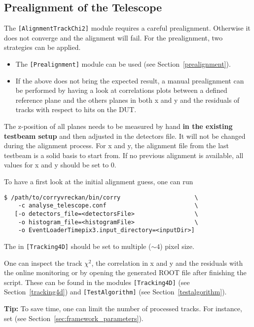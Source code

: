 \subsection*{Prealignment of the Telescope}
The \texttt{[AlignmentTrackChi2]} module requires a careful prealignment. Otherwise it does not converge and the alignment will fail.
For the prealignment, two strategies can be applied.
\begin{itemize}
\item The \texttt{[Prealignment]} module can be used (see Section~\ref{prealignment}).
\item If the above does not bring the expected result, a manual prealignment can be performed by having a look at correlations plots between a defined reference plane and the others planes in both x and y and the residuals of tracks with respect to hits on the DUT.
\end{itemize}

The z-position of all planes needs to be measured by hand \textbf{in the existing testbeam setup} and then adjusted in the detectors file. 
It will not be changed during the alignment process.
For x and y, the alignment file from the last testbeam is a solid basis to start from.
If no previous alignment is available, all values for x and y should be set to 0.

To have a first look at the initial alignment guess, one can run
\begin{verbatim}
$ /path/to/corryvreckan/bin/corry                     \
    -c analyse_telescope.conf                         \
   [-o detectors_file=<detectorsFile>                 \
    -o histogram_file=<histogramFile>                 \
    -o EventLoaderTimepix3.input_directory=<inputDir>]
\end{verbatim}

The \parameter{spatial_cut} in \texttt{[Tracking4D]} should be set to multiple ($\sim4$) pixel size.

One can inspect the track $\chi^2$, the correlation in x and y and the residuals with the online monitoring or by opening the generated ROOT file after finishing the script.
These can be found in the modules \texttt{[Tracking4D]} (see Section~\ref{tracking4d}) and \texttt{[TestAlgorithm]} (see Section~\ref{testalgorithm}).

\begin{warning}
\textbf{Tip:} To save time, one can limit the number of processed tracks. For instance, set \parameter{number_of_tracks = 100000} (see Section~\ref{sec:framework_parameters}).
\end{warning}


